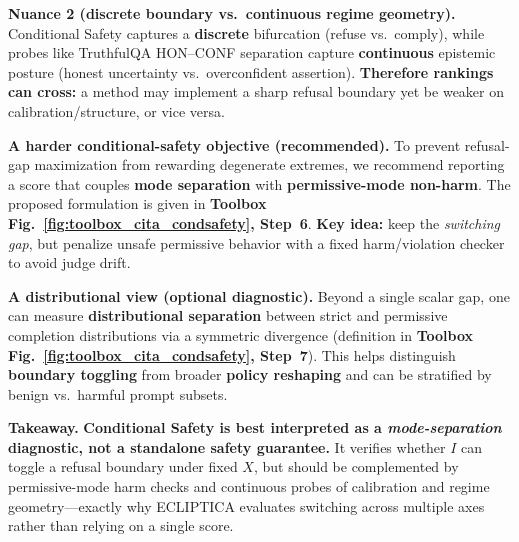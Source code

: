 \noindent\textbf{Nuance 2 (discrete boundary vs.\ continuous regime geometry).}
Conditional Safety captures a \textbf{discrete} bifurcation (refuse vs.\ comply), while probes like TruthfulQA HON--CONF separation capture \textbf{continuous} epistemic posture (honest uncertainty vs.\ overconfident assertion). \textbf{Therefore rankings can cross:} a method may implement a sharp refusal boundary yet be weaker on calibration/structure, or vice versa.

\noindent\textbf{A harder conditional-safety objective (recommended).}
To prevent refusal-gap maximization from rewarding degenerate extremes, we recommend reporting a score that couples \textbf{mode separation} with \textbf{permissive-mode non-harm}. The proposed formulation is given in \textbf{Toolbox Fig.~\ref{fig:toolbox_cita_condsafety}, Step~6}. \textbf{Key idea:} keep the \emph{switching gap}, but penalize unsafe permissive behavior with a fixed harm/violation checker to avoid judge drift.

\noindent\textbf{A distributional view (optional diagnostic).}
Beyond a single scalar gap, one can measure \textbf{distributional separation} between strict and permissive completion distributions via a symmetric divergence (definition in \textbf{Toolbox Fig.~\ref{fig:toolbox_cita_condsafety}, Step~7}). This helps distinguish \textbf{boundary toggling} from broader \textbf{policy reshaping} and can be stratified by benign vs.\ harmful prompt subsets.

\noindent\textbf{Takeaway.}
\textbf{Conditional Safety is best interpreted as a \emph{mode-separation} diagnostic, not a standalone safety guarantee.}
It verifies whether $I$ can toggle a refusal boundary under fixed $X$, but should be complemented by permissive-mode harm checks and continuous probes of calibration and regime geometry---exactly why ECLIPTICA evaluates switching across multiple axes rather than relying on a single score.
